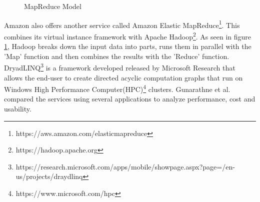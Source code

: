 \documentclass[12pt]{article}
\begin{document}
\begin{figure}
    \begin{center}
    \end{center}
    \caption{MapReduce Model}
    \label{fig:map}
\end{figure}

Amazon also offers another service called Amazon Elastic
MapReduce\footnote{https://aws.amazon.com/elasticmapreduce}. This combines its
virtual instance framework with Apache
Hadoop\footnote{https://hadoop.apache.org}. As seen in figure \ref{fig:map},
Hadoop breaks down the input data into parts, runs them in parallel with the
'Map' function and then combines the results with the 'Reduce' function.
DryadLINQ\footnote{https://research.microsoft.com/apps/mobile/showpage.aspx?page=/en-us/projects/draydlinq}
is a framework developed released by Microsoft Research that allows the end-user
to create directed acyclic computation graphs that run on Windows High
Performance Computer(HPC)\footnote{https://www.microsoft.com/hpc} clusters.
Gunarathne et al. compared the services using several applications to analyze
performance, cost and usability.
\end{document}
